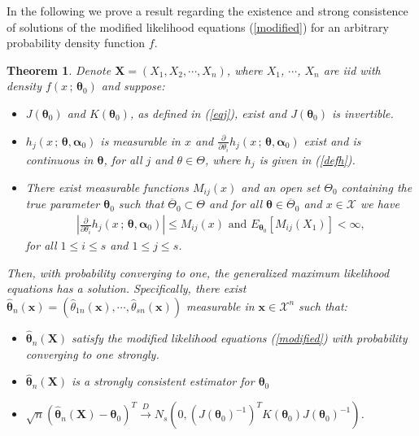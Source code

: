 \documentclass[10pt,a4paper,onecolumn]{article} %
\newtheorem{theorem}{Theorem}[section]
\newcommand{\bs}{\boldsymbol}
\begin{document}

In the following we prove a result regarding the existence and strong consistence of solutions of the modified likelihood equations (\ref{modified}) for an arbitrary probability density function $f$.

\begin{theorem}\label{coprinc} Denote $\bs{X}=\left(X_1, X_2, \cdots, X_n\right)$, where $X_1$, $\cdots$, $X_n$ are iid with density $f(x\,;\,\bs{\theta}_0)$ and suppose:
\begin{itemize}

\item[(A)]  $J(\bs{\theta}_0)$ and $K(\bs{\theta}_0)$, as defined in (\ref{eqj}), exist and $J(\bs{\theta}_0)$ is invertible.
\item[(B)] $h_j(x\, ;\, \bs{\theta},\bs{\alpha}_0)$ is measurable in $x$ and $\frac{\partial}{\partial \theta_i}h_j(x\, ;\, \bs{\theta},\bs{\alpha}_0)$ exist and is continuous in $\bs{\theta}$, for all $j$ and $\theta\in \Theta$, where $h_j$ is given in (\ref{defh}).
\item[(C)] There exist measurable functions $M_{ij}(x)$ and an open set $\Theta_0$ containing the true parameter $\bs{\theta}_0$ such that $\overline{\Theta}_0\subset \Theta$ and for all $\bs{\theta}\in \overline{\Theta}_0$ and $x\in \mathcal{X}$ we have
\begin{equation*}
 \begin{aligned}
 \left|\frac{\partial}{\partial\theta_i} h_j(x\, ;\, \bs{\theta},\bs{\alpha}_0)\right|\leq M_{ij}(x)\mbox{ and }E_{\bs{\theta}_0}\left[M_{ij}(X_1)\right]<\infty,
 \end{aligned}
 \end{equation*}
for all $1\leq i\leq s$ and $1\leq j\leq s$.
\end{itemize}
Then, with probability converging to one, the generalized maximum likelihood equations has a solution. Specifically, there exist  $\bs{\hat{\theta}}_n(\bs{x})=(\hat{\theta}_{1n}(\bs{x}),\cdots,\hat{\theta}_{sn}(\bs{x}))$ measurable in $\bs{x}\in \mathcal{X}^n$ such that:
\begin{itemize}
\item[I)] $\bs{\hat{\theta}}_n(\bs{X})$ satisfy the modified likelihood equations (\ref{modified}) with probability converging to one strongly.
\item[II)] $\bs{\hat{\theta}}_n(\bs{X})$ is a strongly consistent estimator for $\bs{\theta}_0$
\item[III)]
$\sqrt{n}(\bs{\hat{\theta}}_n(\bs{X})-\bs{\theta}_0)^T\overset{D}{\to} N_s\left(0,(J(\bs{\theta}_0)^{-1})^T K(\bs{\theta}_0)J(\bs{\theta}_0)^{-1}\right)$.
\end{itemize}
\end{theorem}
\end{document}
